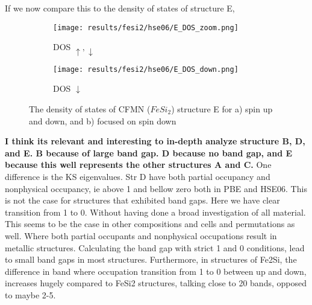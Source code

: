 If we now compare this to the density of states of structure E,

\begin{figure}[H]
\begin{subfigure}{0.5\textwidth}
\texttt{[image: results/fesi2/hse06/E\_DOS\_zoom.png]}
\caption{DOS $\uparrow, \downarrow$}
\end{subfigure}
\hfill
\begin{subfigure}{0.5\textwidth}
\texttt{[image: results/fesi2/hse06/E\_DOS\_down.png]}
\caption{DOS $\downarrow$}
\end{subfigure}
\caption{The density of states of CFMN ($FeSi_2$) structure E for a) spin up and down, and b) focused on spin down}
\end{figure}


\textbf{I think its relevant and interesting to in-depth analyze structure B, D, and E. B because of large band gap. D because no band gap, and E because this well represents the other structures A and C. }
One difference is the KS eigenvalues. Str D have both partial occupancy and nonphysical occupancy, ie above 1 and bellow zero both in PBE and HSE06. This is not the case for structures that exhibited band gaps. Here we have clear transition from 1 to 0. Without having done a broad investigation of all material. This seems to be the case in other compositions and cells and permutations as well. Where both partial occupants and nonphysical occupations result in metallic structures. Calculating the band gap with strict 1 and 0 conditions, lead to small band gaps in most structures. Furthermore, in structures of Fe2Si, the difference in band where occupation transition from 1 to 0 between up and down, increases hugely compared to FeSi2 structures, talking close to 20 bands, opposed to maybe 2-5. 
